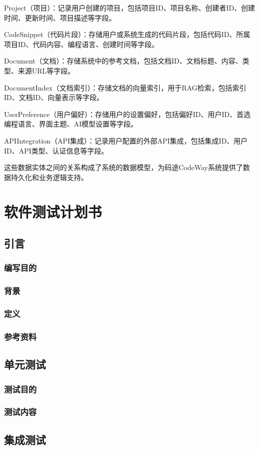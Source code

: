 \documentclass[
    report,     %
    oneside,    %
    UTF8,       %
    zihao=-4    %
]{config} %
\begin{document}
Project（项目）：记录用户创建的项目，包括项目ID、项目名称、创建者ID、创建时间、更新时间、项目描述等字段。

CodeSnippet（代码片段）：存储用户或系统生成的代码片段，包括代码ID、所属项目ID、代码内容、编程语言、创建时间等字段。

Document（文档）：存储系统中的参考文档，包括文档ID、文档标题、内容、类型、来源URL等字段。

DocumentIndex（文档索引）：存储文档的向量索引，用于RAG检索，包括索引ID、文档ID、向量表示等字段。

UserPreference（用户偏好）：存储用户的设置偏好，包括偏好ID、用户ID、首选编程语言、界面主题、AI模型设置等字段。

APIIntegration（API集成）：记录用户配置的外部API集成，包括集成ID、用户ID、API类型、认证信息等字段。

这些数据实体之间的关系构成了系统的数据模型，为码途CodeWay系统提供了数据持久化和业务逻辑支持。
\chapter{软件测试计划书}
\section{引言}
\subsection{编写目的}
\subsection{背景}
\subsection{定义}
\subsection{参考资料}
\section{单元测试}
\subsection{测试目的}
\subsection{测试内容}
\section{集成测试}
\end{document}
